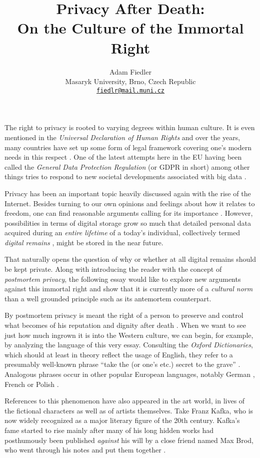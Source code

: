\documentclass[a4paper]{article}
\title{
    Privacy After Death:\\
    On the Culture of the Immortal Right
}
\author{
    Adam Fiedler\\
    \small
    Masaryk University, Brno, Czech Republic\\
    \small
    \texttt{\href{mailto:fiedlr@mail.muni.cz}{fiedlr@mail.muni.cz}}
}
\date{}
\begin{document}
\maketitle

The right to privacy is rooted to varying degrees within human culture. It is even mentioned in the \textit{Universal Declaration of Human Rights} \cite{udrights} and over the years, many countries have set up some form of legal framework covering one's modern needs in this respect \cite{consumerreport}. One of the latest attempts here in the EU having been called the \textit{General Data Protection Regulation} (or GDPR in short) among other things tries to respond to new societal developments associated with big data \cite{louveaux}.

Privacy has been an important topic heavily discussed again with the rise of the Internet. Besides turning to our own opinions and feelings about how it relates to freedom, one can find reasonable arguments calling for its importance \cite{harbinja2}. 
However, possibilities in terms of digital storage grow so much that detailed personal data acquired during an \emph{entire lifetime} of a today's individual, collectively termed \textit{digital remains} \cite{buitelaar}, might be stored in the near future. 

That naturally opens the question of why or whether at all digital remains should be kept private. Along with introducing the reader with the concept of \textit{postmortem privacy}, the following essay would like to explore new arguments against this immortal right and show that it is currently more of a \emph{cultural norm} than a well grounded principle such as its antemortem counterpart.

\medskip
By postmortem privacy is meant the right of a person to preserve and control what becomes of his reputation and dignity after death \cite{harbinja2, buitelaar}. When we want to see just how much ingrown it is into the Western culture, we can begin, for example, by analyzing the language of this very essay. Consulting the \textit{Oxford Dictionaries}, which should at least in theory reflect the usage of English, they refer to a presumably well-known phrase ``take the (or one's etc.) secret to the grave'' \cite{oxford}. Analogous phrases occur in other popular European languages, notably German \cite{duden}, French \cite{larousse} or Polish \cite{wsjp}.

References to this phenomenon have also appeared in the art world, in lives of the fictional characters as well as of artists themselves. Take Franz Kafka, who is now widely recognized as a major literary figure of the 20th century. 
Kafka's fame started to rise mainly after many of his long hidden works had posthumously been published \emph{against} his will by a close friend named Max Brod, who went through his notes and put them together \cite{kafka, brod}.
\end{document}
